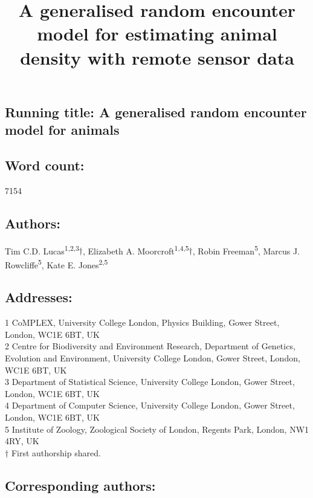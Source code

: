 \documentclass[a4paper,10pt,reqno,oneside]{amsart}
\begin{document}
\title[Lucas \emph{et al.}: A generalised random encounter model for animals]{A generalised random encounter model for estimating animal density with remote sensor data}
\maketitle

\subsection*{ Running title: A generalised random encounter model for animals}

\subsection*{ Word count:} 7154

\subsection*{ Authors:\\}
Tim C.D. Lucas\textsuperscript{1,2,3}$\dagger$, Elizabeth A. Moorcroft\textsuperscript{1,4,5}$\dagger$, Robin Freeman\textsuperscript{5}, Marcus J. Rowcliffe\textsuperscript{5}, Kate E. Jones\textsuperscript{2,5}


\subsection*{ Addresses:\\}
1 CoMPLEX, University College London, Physics Building, Gower Street, London, WC1E 6BT, UK\\ 
2 Centre for Biodiversity and Environment Research, Department of Genetics, Evolution and Environment, University College London, Gower Street, London, WC1E 6BT, UK\\ 
3 Department of Statistical Science, University College London, Gower Street, London, WC1E 6BT, UK\\ 
4 Department of Computer Science, University College London, Gower Street, London, WC1E 6BT, UK\\ 
5 Institute of Zoology, Zoological Society of London, Regents Park, London, NW1 4RY, UK\\
$\dagger$ First authorship shared. 

\subsection*{ Corresponding authors:\\}
\end{document}
